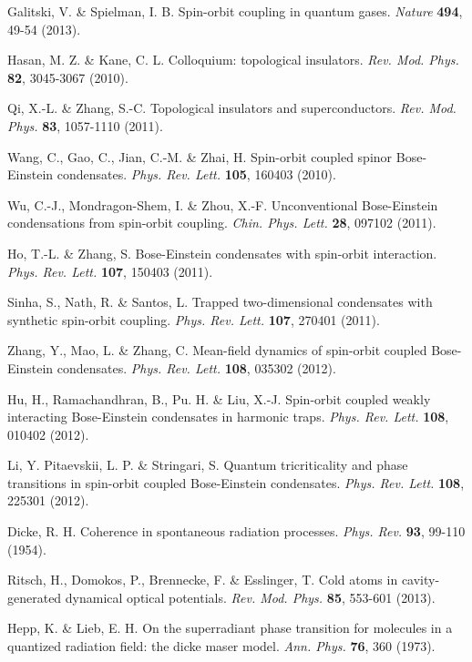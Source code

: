 \documentclass[prl,aps,twocolumn,floatfix]{revtex4}
\begin{document}
\begin{thebibliography}{99}
 Galitski, V. \& Spielman, I. B. Spin-orbit coupling in
quantum gases. \textit{Nature} \textbf{494}, 49-54 (2013).

 Hasan, M. Z. \& Kane, C. L. Colloquium: topological
insulators. \textit{Rev. Mod. Phys.} \textbf{82}, 3045-3067 (2010).

 Qi, X.-L. \& Zhang, S.-C. Topological insulators and
superconductors. \textit{Rev. Mod. Phys.} \textbf{83}, 1057-1110 (2011).

 Wang, C., Gao, C., Jian, C.-M. \& Zhai, H. Spin-orbit coupled
spinor Bose-Einstein condensates. \textit{Phys. Rev. Lett.} \textbf{105},
160403 (2010).

 Wu, C.-J., Mondragon-Shem, I. \& Zhou, X.-F. Unconventional
Bose-Einstein condensations from spin-orbit coupling. \textit{Chin. Phys.
Lett.} \textbf{28}, 097102 (2011).

 Ho, T.-L. \& Zhang, S. Bose-Einstein condensates with
spin-orbit interaction. \textit{Phys. Rev. Lett.} \textbf{107}, 150403
(2011).

 Sinha, S., Nath, R. \& Santos, L. Trapped two-dimensional
condensates with synthetic spin-orbit coupling. \textit{Phys. Rev. Lett.}
\textbf{107}, 270401 (2011).

 Zhang, Y., Mao, L. \& Zhang, C. Mean-field dynamics of
spin-orbit coupled Bose-Einstein condensates. \textit{Phys. Rev. Lett.}
\textbf{108}, 035302 (2012).

 Hu, H., Ramachandhran, B., Pu. H. \& Liu, X.-J. Spin-orbit
coupled weakly interacting Bose-Einstein condensates in harmonic traps.
\textit{Phys. Rev. Lett.} \textbf{108}, 010402 (2012).

 Li, Y. Pitaevskii, L. P. \& Stringari, S. Quantum
tricriticality and phase transitions in spin-orbit coupled Bose-Einstein
condensates. \textit{Phys. Rev. Lett.} \textbf{108}, 225301 (2012).

 Dicke, R. H. Coherence in spontaneous radiation processes.
\textit{Phys. Rev.} \textbf{93}, 99-110 (1954).

 Ritsch, H., Domokos, P., Brennecke, F. \& Esslinger, T.
Cold atoms in cavity-generated dynamical optical potentials. \textit{Rev.
Mod. Phys.} \textbf{85}, 553-601 (2013).

 Hepp, K. \& Lieb, E. H. On the superradiant phase transition
for molecules in a quantized radiation field: the dicke maser model. \textit{%
Ann. Phys.} \textbf{76}, 360 (1973).


\end{thebibliography}
\end{document}
